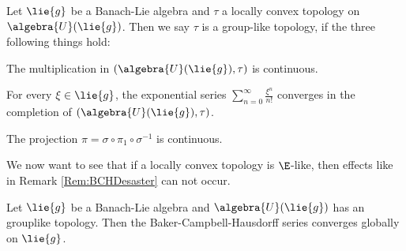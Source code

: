 \documentclass[
11pt,                          %
english                        %
]{article}
\begin{document}
\begin{definition}
	\label{prop:bchdesaster}
	Let $\lie{g}$ be a Banach-Lie algebra and $\tau$ a locally convex topology on 
	$\algebra{U}(\lie{g})$. Then we say $\tau$ is a group-like topology, if the 
	three following things hold:
	\begin{definitionlist}
		\item
		The multiplication in $(\algebra{U}(\lie{g}), \tau)$ is continuous.
		
		\item
		For every $\xi \in \lie{g}$, the exponential series $\sum_{n=0}^\infty 
		\frac{\xi^n}{n!}$ converges in the completion of $(\algebra{U}(\lie{g}), 
		\tau)$.
		
		\item
		The projection $\pi = \sigma \circ \pi_1 \circ \sigma^{-1}$ is continuous.
	\end{definitionlist}
\end{definition}
We now want to see that if a locally convex topology is $\E$-like, then effects 
like in Remark \ref{Rem:BCHDesaster} can not occur. 
\begin{proposition}
	Let $\lie{g}$ be a Banach-Lie algebra and $\algebra{U}(\lie{g})$ has an 
	grouplike topology. Then the Baker-Campbell-Hausdorff series converges globally 
	on $\lie{g}$.
\end{proposition}
\end{document}

